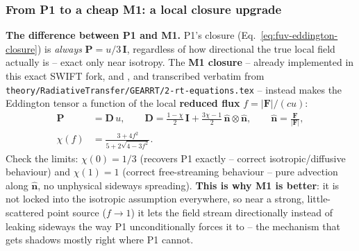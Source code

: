 \subsubsection{From P1 to a cheap M1: a local closure upgrade}
\label{sec:fuv-b-m1}

\textbf{The difference between P1 and M1.} P1's closure
(Eq.~\ref{eq:fuv-eddington-closure}) is \emph{always} $\mathbf P=u/3\,
\mathbf I$, regardless of how directional the true local field actually
is -- exact only near isotropy. The \textbf{M1 closure}
\citep{Levermore1984} -- already implemented in this exact SWIFT fork,
 and , and transcribed verbatim from
\texttt{theory/RadiativeTransfer/GEARRT/2-rt-equations.tex} -- instead
makes the Eddington tensor a function of the local \textbf{reduced
flux} $f=|\mathbf F|/(cu)$:
\begin{align}
  \mathbf P &= \mathbf D\,u , \qquad
  \mathbf D = \frac{1-\chi}{2}\,\mathbf I + \frac{3\chi-1}{2}\,
    \hat{\mathbf n}\otimes\hat{\mathbf n} , \qquad
  \hat{\mathbf n}=\frac{\mathbf F}{|\mathbf F|} ,
  \label{eq:fuv-m1-closure} \\
  \chi(f) &= \frac{3+4f^2}{5+2\sqrt{4-3f^2}} .
  \label{eq:fuv-m1-chi}
\end{align}
Check the limits: $\chi(0)=1/3$ (recovers P1 exactly -- correct
isotropic/diffusive behaviour) and $\chi(1)=1$ (correct free-streaming
behaviour -- pure advection along $\hat{\mathbf n}$, no unphysical
sideways spreading). \textbf{This is why M1 is better}: it is not
locked into the isotropic assumption everywhere, so near a strong,
little-scattered point source ($f\to1$) it lets the field stream
directionally instead of leaking sideways the way P1 unconditionally
forces it to -- the mechanism that gets shadows mostly right where P1
cannot.

